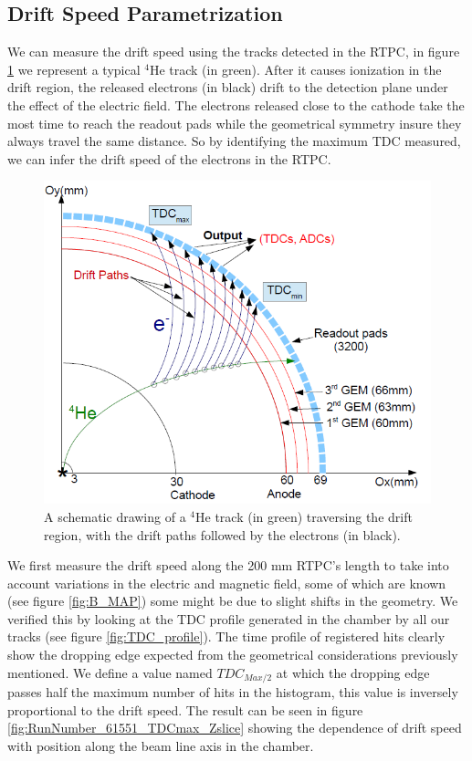 \documentclass[twocolumn,showpacs,superscriptaddress,groupedaddress]{revtex4}
\begin{document}
\subsection{Drift Speed Parametrization}

We can measure the drift speed using the tracks detected in the RTPC, in figure 
\ref{fig:RTPC_signals} we represent a typical $^{4}$He track (in green). After 
it causes ionization in the drift region, the released electrons (in black) 
drift to the detection plane under the effect of the electric field. The 
electrons released close to the cathode take the most time to reach the readout 
pads while the geometrical symmetry insure they always travel the same 
distance. So by identifying the maximum TDC measured, we can infer the drift 
speed of the electrons in the RTPC.\\

\begin{figure}[tb]
\centering
\includegraphics[scale=0.35]{fig/RTPC_2.png}
\caption[]{A schematic drawing of a $^{4}$He track (in green) traversing the 
drift region, with the drift paths followed by the electrons (in black). } 
\label{fig:RTPC_signals}
\end{figure}

We first measure the drift speed along the 200 mm RTPC's length to take into 
account variations in the electric and magnetic field, some of which are known 
(see figure \ref{fig:B_MAP}) some might be due to slight shifts in the 
geometry. We verified this by looking at the TDC profile generated in the 
chamber by all our tracks (see figure \ref{fig:TDC_profile}). The time profile 
of registered hits clearly show the dropping edge expected from the geometrical 
considerations previously mentioned. We define a value named $TDC_{Max/2}$ at 
which the dropping edge passes half the maximum number of hits in the 
histogram, this value is inversely proportional to the drift speed. The result 
can be seen in figure \ref{fig:RunNumber_61551_TDCmax_Zslice} showing the 
dependence of drift speed with position along the beam line axis in the 
chamber. 
\end{document}
